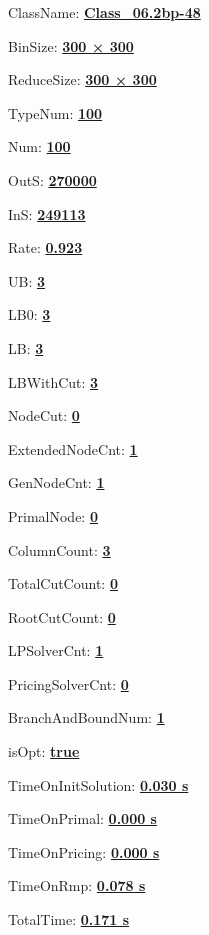 \documentclass[11pt]{article}
\begin{document}
\pagestyle{empty}


ClassName: \underline{\textbf{Class_06.2bp-48}}
\par
BinSize: \underline{\textbf{300 × 300}}
\par
ReduceSize: \underline{\textbf{300 × 300}}
\par
TypeNum: \underline{\textbf{100}}
\par
Num: \underline{\textbf{100}}
\par
OutS: \underline{\textbf{270000}}
\par
InS: \underline{\textbf{249113}}
\par
Rate: \underline{\textbf{0.923}}
\par
UB: \underline{\textbf{3}}
\par
LB0: \underline{\textbf{3}}
\par
LB: \underline{\textbf{3}}
\par
LBWithCut: \underline{\textbf{3}}
\par
NodeCut: \underline{\textbf{0}}
\par
ExtendedNodeCnt: \underline{\textbf{1}}
\par
GenNodeCnt: \underline{\textbf{1}}
\par
PrimalNode: \underline{\textbf{0}}
\par
ColumnCount: \underline{\textbf{3}}
\par
TotalCutCount: \underline{\textbf{0}}
\par
RootCutCount: \underline{\textbf{0}}
\par
LPSolverCnt: \underline{\textbf{1}}
\par
PricingSolverCnt: \underline{\textbf{0}}
\par
BranchAndBoundNum: \underline{\textbf{1}}
\par
isOpt: \underline{\textbf{true}}
\par
TimeOnInitSolution: \underline{\textbf{0.030 s}}
\par
TimeOnPrimal: \underline{\textbf{0.000 s}}
\par
TimeOnPricing: \underline{\textbf{0.000 s}}
\par
TimeOnRmp: \underline{\textbf{0.078 s}}
\par
TotalTime: \underline{\textbf{0.171 s}}
\par
\newpage
\end{document}
